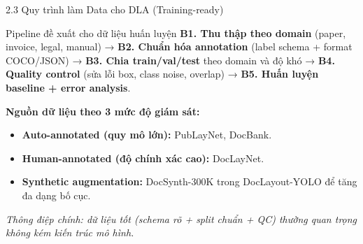 \documentclass[aspectratio=1610,8pt]{beamer}
\begin{document}
\begin{frame}{2.3 \; Quy trình làm Data cho DLA (Training-ready)}
    \begin{block}{Pipeline đề xuất cho dữ liệu huấn luyện}
                	\textbf{B1. Thu thập theo domain} (paper, invoice, legal, manual) →
                	\textbf{B2. Chuẩn hóa annotation} (label schema + format COCO/JSON) →
                	\textbf{B3. Chia train/val/test} theo domain và độ khó →
                	\textbf{B4. Quality control} (sửa lỗi box, class noise, overlap) →
                	\textbf{B5. Huấn luyện baseline + error analysis}.
    \end{block}

        \vspace{0.4em}
        	\textbf{Nguồn dữ liệu theo 3 mức độ giám sát:}
    \begin{itemize}
        \item \textbf{Auto-annotated (quy mô lớn):} PubLayNet, DocBank\cite{zhong2019publaynet,li2020docbank}.
        \item \textbf{Human-annotated (độ chính xác cao):} DocLayNet\cite{dla_benchmark_2022_sigkdd_2022_doclaynet_a_large_human_annotated_dataset_for_documen}.
        \item \textbf{Synthetic augmentation:} DocSynth-300K trong DocLayout-YOLO để tăng đa dạng bố cục\cite{dla_2024_arxiv_doclayout_yolo_enhancing_document_layout_analysis_through_diverse_syn}.
    \end{itemize}

        \vspace{0.3em}
        	\textit{Thông điệp chính: dữ liệu tốt (schema rõ + split chuẩn + QC) thường quan trọng không kém kiến trúc mô hình.}
\end{frame}
\end{document}
